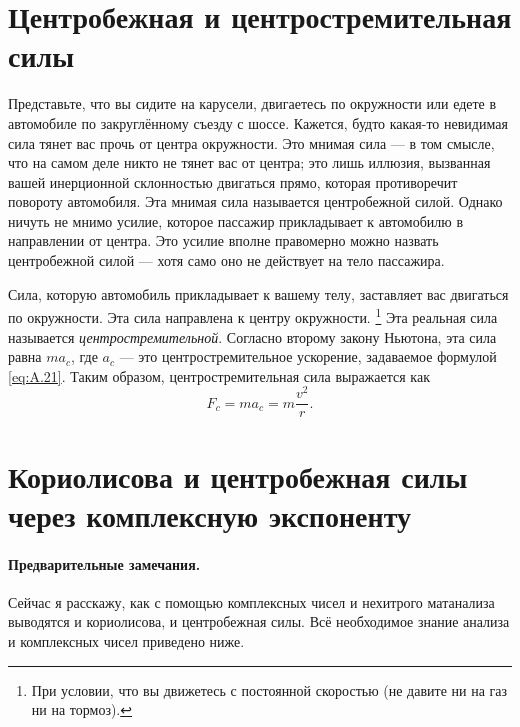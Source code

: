 \section{Центробежная и центростремительная силы}\label{Центробежная и центростремительная силы}

Представьте, что вы сидите на карусели, двигаетесь по окружности или едете в автомобиле по закруглённому съезду с шоссе.
Кажется, будто какая-то невидимая сила тянет вас прочь от центра окружности.
Это мнимая сила — в том смысле, что на самом деле никто не тянет вас от центра; это лишь иллюзия, вызванная вашей инерционной склонностью двигаться прямо, которая противоречит повороту автомобиля.
Эта мнимая сила называется центробежной силой.
Однако ничуть не мнимо усилие, которое пассажир прикладывает к автомобилю в направлении от центра.
Это усилие вполне правомерно можно назвать центробежной силой — хотя само оно не действует на тело пассажира.

Сила, которую автомобиль прикладывает к вашему телу, заставляет вас двигаться по окружности.
Эта сила направлена к центру окружности.%
\footnote{При условии, что вы движетесь с постоянной скоростью (не давите ни на газ ни на тормоз).}
Эта реальная сила называется \emph{центростремительной}.
Согласно второму закону Ньютона, эта сила равна $ma_{c}$, где $a_{c}$ — это центростремительное ускорение, задаваемое формулой \eqref{eq:A.21}.
Таким образом, центростремительная сила выражается как
\[F_{c} = ma_{c} = m\frac{v^{2}}{r}.\]

\section{Кориолисова и центробежная силы через комплексную экспоненту}\label{sec:A.9}

\paragraph{Предварительные замечания.}
Сейчас я расскажу, как с помощью комплексных чисел и нехитрого матанализа выводятся и кориолисова, и центробежная силы.
Всё необходимое знание анализа и комплексных чисел приведено ниже.

